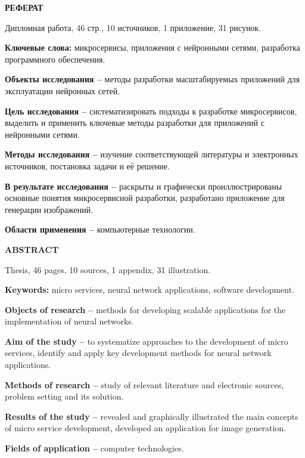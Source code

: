 \begin{center}
  \large\bfseries{РЕФЕРАТ}
\end{center}

Дипломная работа, 46 стр., 10 источников, 1 приложение, 31 рисунок.

\textbf{Ключевые слова:} микросервисы, приложения с нейронными сетями, разработка программного обеспечения.

\textbf{Объекты исследования --} методы разработки масштабируемых приложений для эксплуатации нейронных сетей.

\textbf{Цель исследования --} систематизировать подходы к разработке микросервисов, выделить и применить ключевые методы разработки для приложений с нейронными сетями.

\textbf{Методы исследования --} изучение соответствующей литературы и электронных источников, постановка задачи и её решение.

\textbf{В результате исследования --} раскрыты и графически проиллюстрированы основные понятия микросервисной разработки, разработано приложение для генерации изображений.

\textbf{Области применения --} компьютерные технологии.

\newpage

\begin{center}
  \large\bfseries{ABSTRACT}
\end{center}

Thesis, 46 pages, 10 sources, 1 appendix, 31 illustration.

\textbf{Keywords:} micro services, neural network applications, software development.

\textbf{Objects of research --} methods for developing scalable applications for the implementation of neural networks.

\textbf{Aim of the study --} to systematize approaches to the development of micro services, identify and apply key development methods for neural network app\-lications.

\textbf{Methods of research --} study of relevant literature and electronic sources, problem setting and its solution.

\textbf{Results of the study --} revealed and graphically illustrated the main concepts of micro service development, developed an application for image generation.

\textbf{Fields of application --} computer technologies.

\newpage

